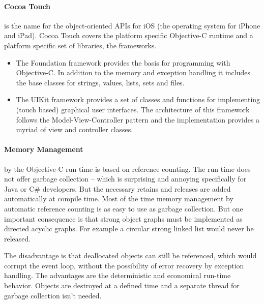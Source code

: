 \paragraph{Cocoa Touch}
\label{sec:Cocoa}
is the name for the object-oriented APIs for iOS (the operating system for iPhone and iPad). 
Cocoa Touch covers the platform specific Objective-C runtime and a platform specific set of libraries, the frameworks.

\begin{itemize}
\item\label{secitem:CocoaFoundation}
The Foundation framework provides the basis for programming with Objective-C. 
In addition to the memory and exception handling it includes the base classes for strings, values, lists, sets and files.
\item\label{secitem:CocoaUIKit} The UIKit framework provides a set of classes and functions for implementing (touch based) graphical user interfaces. 
The architecture of this framework follows the Model-View-Controller pattern 
and the implementation provides a myriad of view and controller classes.
\end{itemize}

\paragraph{Memory Management} 
\label{sec:MemoryManagement}
by the Objective-C run time is based on reference counting. 
The run time does not offer  garbage collection – which is surprising and annoying specifically for Java or C\# developers. 
But the necessary retains and releases are added automatically at compile time.
Most of the time memory management by automatic reference counting is as easy to use as garbage collection.
But one important consequence is that strong object graphs must be implemented as directed acyclic graphs. 
For example a circular strong linked list would never be released. 

The disadvantage is that deallocated objects can still be referenced, 
which would corrupt the event loop,
without the possibility of error recovery by exception handling.
The advantages are the deterministic and economical run-time behavior.
Objects are destroyed at a defined time and a separate thread for garbage collection isn't needed. 



